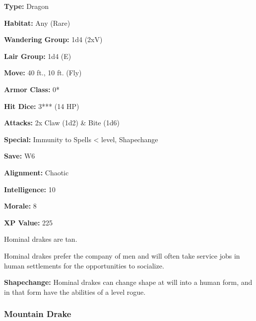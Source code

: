 \begin{multicols*}{2}
{\textbf{Type:} Dragon

\textbf{Habitat:} Any (Rare)

\textbf{Wandering Group:} 1d4 (2xV)

\textbf{Lair Group:} 1d4 (E)

\textbf{Move:} 40 ft., 10 ft. (Fly)

\textbf{Armor Class:} 0*

\textbf{Hit Dice:} 3*** (14 HP)

\textbf{Attacks:} 2x Claw (1d2) \& Bite (1d6)

\textbf{Special:} Immunity to Spells <  level, Shapechange

\textbf{Save:} W6

\textbf{Alignment:} Chaotic

\textbf{Intelligence:} 10

\textbf{Morale:} 8

\textbf{XP Value:} 225}

Hominal drakes are tan.

Hominal drakes prefer the company of men and will often take service jobs in human settlements for the opportunities to socialize.

\textbf{Shapechange:} Hominal drakes can change shape at will into a human form, and in that form have the abilities of a  level rogue.

\subsubsection{Mountain Drake}
\end{multicols*}
